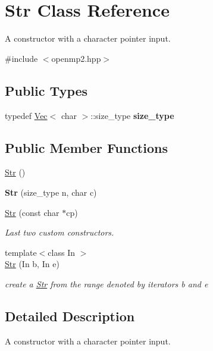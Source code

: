 \hypertarget{classStr}{}\section{Str Class Reference}
\label{classStr}


A constructor with a character pointer input.  




{\ttfamily \#include $<$openmp2.\+hpp$>$}

\subsection*{Public Types}
\begin{DoxyCompactItemize}
\item 
\mbox{\label{classStr_a8a51ef48a27e5e597fde5edd7d36f7d8}} 
typedef \hyperlink{classVec}{Vec}$<$ char $>$\+::size\+\_\+type {\bfseries size\+\_\+type}
\end{DoxyCompactItemize}
\subsection*{Public Member Functions}
\begin{DoxyCompactItemize}
\item 
\hyperlink{classStr_a51d07a34edbcb6ab60c23c0a1f6d2625}{Str} ()
\item 
\mbox{\label{classStr_afedfc049e090cc83be3ea834948f28ba}} 
{\bfseries Str} (size\+\_\+type n, char c)
\item 
\hyperlink{classStr_a8235816d2687bf223490568a18124cf4}{Str} (const char $\ast$cp)
\begin{DoxyCompactList}\small\item\em Last two custom constructors. \end{DoxyCompactList}\item 
{\footnotesize template$<$class In $>$ }\\\hyperlink{classStr_a92caed2384063dca67f93a9788ed1115}{Str} (In b, In e)
\begin{DoxyCompactList}\small\item\em create a \hyperlink{classStr}{Str} from the range denoted by iterators b and e \end{DoxyCompactList}\end{DoxyCompactItemize}


\subsection{Detailed Description}
A constructor with a character pointer input. 



